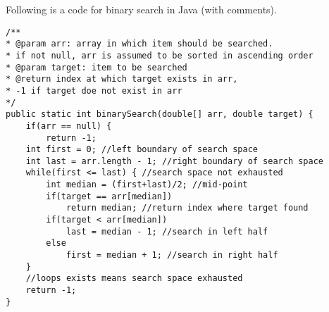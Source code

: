 Following is a code for binary search in Java (with comments).

\begin{lstlisting}[style=junit]
/**
* @param arr: array in which item should be searched.
* if not null, arr is assumed to be sorted in ascending order
* @param target: item to be searched
* @return index at which target exists in arr, 
* -1 if target doe not exist in arr
*/
public static int binarySearch(double[] arr, double target) {
	if(arr == null) {
		return -1;
	int first = 0; //left boundary of search space
	int last = arr.length - 1; //right boundary of search space
	while(first <= last) { //search space not exhausted
		int median = (first+last)/2; //mid-point
		if(target == arr[median])
			return median; //return index where target found
		if(target < arr[median])
			last = median - 1; //search in left half
		else
			first = median + 1; //search in right half
	}
	//loops exists means search space exhausted
	return -1;	
}
\end{lstlisting}

